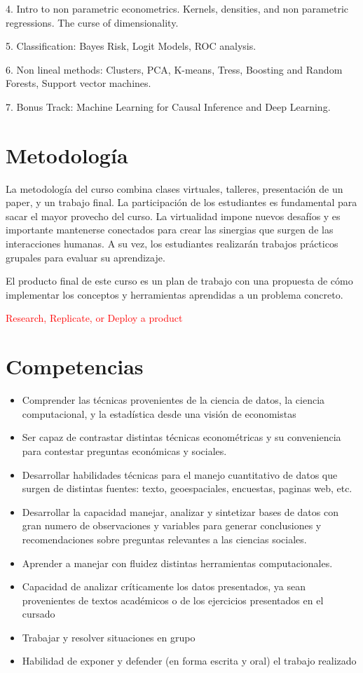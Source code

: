 \documentclass[11pt]{article}
\begin{document}
4.	Intro to non parametric econometrics. Kernels, densities, and non parametric regressions. The curse of dimensionality.

5.	Classification: Bayes Risk, Logit Models, ROC analysis.

6.	Non lineal methods: Clusters, PCA, K-means, Tress, Boosting and Random Forests, Support vector machines.

7. Bonus Track: Machine Learning for Causal Inference and Deep Learning. 





\section{Metodología}
La metodología del curso combina clases virtuales, talleres, presentación de un paper, y un trabajo final. La participación de los estudiantes es fundamental para sacar el mayor provecho del curso. La virtualidad impone nuevos desafíos y es importante mantenerse conectados para crear las sinergias que surgen de las interacciones humanas. A su vez, los estudiantes realizarán trabajos prácticos grupales para evaluar su aprendizaje. 

El producto final de este curso es un plan de trabajo con una propuesta de cómo implementar los conceptos y herramientas aprendidas a un problema concreto. 

\textcolor{red}{Research, Replicate, or Deploy a product}


\section{Competencias}

\begin{itemize}
\item Comprender las técnicas provenientes de la ciencia de datos, la ciencia computacional, y la estadística desde una visión de economistas 
\item Ser capaz de contrastar distintas técnicas econométricas y su conveniencia para contestar preguntas económicas y sociales.
\item Desarrollar habilidades técnicas para el manejo cuantitativo de datos que surgen de distintas fuentes: texto, geoespaciales, encuestas, paginas web, etc.
\item Desarrollar la capacidad manejar, analizar y sintetizar bases de datos con gran numero de observaciones y variables para generar conclusiones y recomendaciones sobre preguntas relevantes a las ciencias sociales.
\item Aprender a manejar con fluidez distintas herramientas computacionales.
\item Capacidad de analizar críticamente los datos presentados, ya sean provenientes de textos académicos o de los ejercicios presentados en el cursado
\item Trabajar y resolver situaciones en grupo 
\item Habilidad de exponer y defender (en forma escrita y oral) el trabajo realizado 



\end{itemize}
\end{document}
